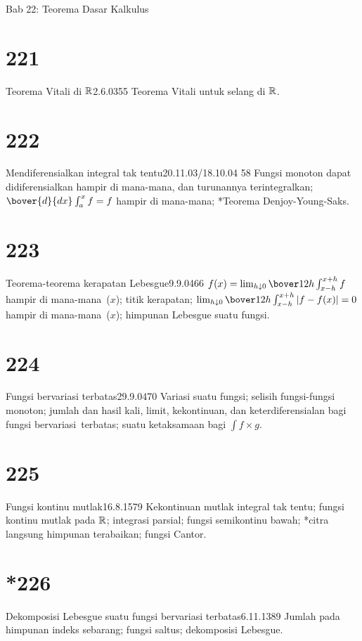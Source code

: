 
Bab 22:  Teorema Dasar Kalkulus


\section{221}{Teorema Vitali di $\Bbb{R}$}{2.6.03}{55}{}
{Teorema Vitali untuk selang di $\Bbb{R}$.}

\section{222}{Mendiferensialkan integral tak tentu}{20.11.03/18.10.04}
{58}{}
{Fungsi monoton dapat didiferensialkan hampir di mana-mana, dan
turunannya terintegralkan; $\bover{d}{dx}\int_a^xf=f$ hampir di mana-mana;
*Teorema Denjoy-Young-Saks.}

\section{223}{Teorema-teorema kerapatan Lebesgue}{9.9.04}{66}{}
{$f(x)=\lim_{h{\downarrow}0}\bover1{2h}\int_{x-h}^{x+h}f$ hampir di
mana-mana\ ($x$); titik kerapatan;
$\lim_{h{\downarrow}0}\bover1{2h}\int_{x-h}^{x+h}|f-f(x)|=0$ hampir di
mana-mana\ ($x$); himpunan Lebesgue suatu fungsi.}

\section{224}{Fungsi bervariasi terbatas}{29.9.04}{70}{}
{Variasi suatu fungsi; selisih fungsi-fungsi monoton;
jumlah dan hasil kali, limit, kekontinuan, dan keterdiferensialan bagi
fungsi bervariasi\
terbatas; suatu ketaksamaan bagi ${\int}f{\times}g$.}

\section{225}{Fungsi kontinu mutlak}{16.8.15}{79}{}
{Kekontinuan mutlak integral tak tentu; fungsi kontinu mutlak
pada $\Bbb{R}$; integrasi parsial; fungsi semikontinu bawah;
*citra langsung himpunan terabaikan; fungsi Cantor.}

\section{*226}{Dekomposisi Lebesgue suatu fungsi bervariasi
terbatas}{6.11.13}{89}{}
{Jumlah pada himpunan indeks sebarang; fungsi saltus; dekomposisi
Lebesgue.}

